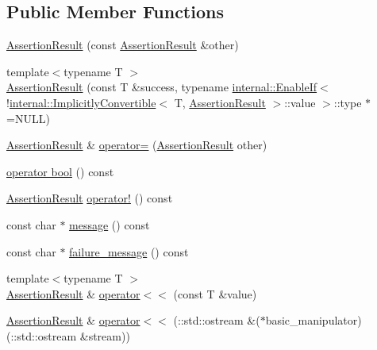 \subsection*{Public Member Functions}
\begin{DoxyCompactItemize}
\item 
\hyperlink{classtesting_1_1AssertionResult_a27788116f03f90aec4daf592fd809ead}{Assertion\+Result} (const \hyperlink{classtesting_1_1AssertionResult}{Assertion\+Result} \&other)
\item 
{\footnotesize template$<$typename T $>$ }\\\hyperlink{classtesting_1_1AssertionResult_a9b8d1d6d0a979d0769ed4ff97d06c4e3}{Assertion\+Result} (const T \&success, typename \hyperlink{structtesting_1_1internal_1_1EnableIf}{internal\+::\+Enable\+If}$<$ !\hyperlink{classtesting_1_1internal_1_1ImplicitlyConvertible}{internal\+::\+Implicitly\+Convertible}$<$ T, \hyperlink{classtesting_1_1AssertionResult}{Assertion\+Result} $>$\+::value $>$\+::type $\ast$=N\+U\+LL)
\item 
\hyperlink{classtesting_1_1AssertionResult}{Assertion\+Result} \& \hyperlink{classtesting_1_1AssertionResult_aad9274c7b69eda67eb9306963a790839}{operator=} (\hyperlink{classtesting_1_1AssertionResult}{Assertion\+Result} other)
\item 
\hyperlink{classtesting_1_1AssertionResult_ab3f34b1623c82762ef4a8f52b535159c}{operator bool} () const
\item 
\hyperlink{classtesting_1_1AssertionResult}{Assertion\+Result} \hyperlink{classtesting_1_1AssertionResult_a5b0784686a756660ac8dfe528d89386b}{operator!} () const
\item 
const char $\ast$ \hyperlink{classtesting_1_1AssertionResult_a33c14dafd28e3393c841e03f4b70a017}{message} () const
\item 
const char $\ast$ \hyperlink{classtesting_1_1AssertionResult_aa38908d5a48c912434a80c8725f52583}{failure\+\_\+message} () const
\item 
{\footnotesize template$<$typename T $>$ }\\\hyperlink{classtesting_1_1AssertionResult}{Assertion\+Result} \& \hyperlink{classtesting_1_1AssertionResult_a3230efa81aafe7c61f5fb878cfa39e91}{operator$<$$<$} (const T \&value)
\item 
\hyperlink{classtesting_1_1AssertionResult}{Assertion\+Result} \& \hyperlink{classtesting_1_1AssertionResult_a43ae8a260843ce2ff3dc9af262672b8b}{operator$<$$<$} (\+::std\+::ostream \&($\ast$basic\+\_\+manipulator)(\+::std\+::ostream \&stream))
\end{DoxyCompactItemize}
